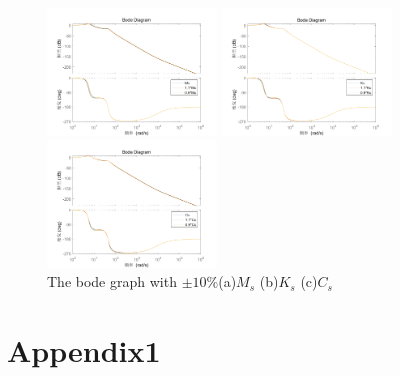 \documentclass[UTF8,a4paper,11pt]{article}
\begin{document}
\begin{figure}[h]
	\begin{minipage}{4cm}
		\centering
		\includegraphics[width=4.5cm]{./figures/figMs.png}
		\caption{}
	\end{minipage}
	\begin{minipage}{4cm}        %
		\hspace{2mm}
		\includegraphics[width=4.5cm]{./figures/figKs.png}
		\caption{}
	\end{minipage}
	\begin{minipage}{4cm}
	\centering
	\includegraphics[width=4.5cm]{./figures/figCs.png}
	\caption{}
\end{minipage}
\caption{The bode graph  with $\pm10\%$(a)$M_s $ (b)$K_s $ (c)$ C_s$}
\end{figure}
\section{Appendix1}
\end{document}
